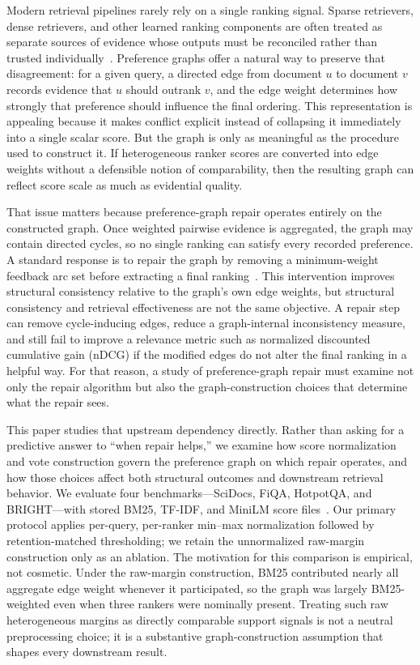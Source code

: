 \documentclass[manuscript,anonymous,review]{acmart}
\begin{document}
Modern retrieval pipelines rarely rely on a single ranking signal. Sparse
retrievers, dense retrievers, and other learned ranking components are often
treated as separate sources of evidence whose outputs must be reconciled
rather than trusted individually~\cite{liu2011learning,burges2005learning,dwork2001rank,ailon2008aggregating}.
Preference graphs offer a natural way to preserve that disagreement: for a
given query, a directed edge from document $u$ to document $v$ records
evidence that $u$ should outrank $v$, and the edge weight determines how
strongly that preference should influence the final ordering. This
representation is appealing because it makes conflict explicit instead of
collapsing it immediately into a single scalar score. But the graph is only
as meaningful as the procedure used to construct it. If heterogeneous ranker
scores are converted into edge weights without a defensible notion of
comparability, then the resulting graph can reflect score scale as much as
evidential quality.

That issue matters because preference-graph repair operates entirely on the
constructed graph. Once weighted pairwise evidence is aggregated, the graph
may contain directed cycles, so no single ranking can satisfy every recorded
preference. A standard response is to repair the graph by removing a
minimum-weight feedback arc set before extracting a final ranking~\cite{ailon2008aggregating,kenyon2007fewerrors}.
This intervention improves structural consistency relative to the graph's own
edge weights, but structural consistency and retrieval effectiveness are not
the same objective. A repair step can remove cycle-inducing edges, reduce a
graph-internal inconsistency measure, and still fail to improve a relevance
metric such as normalized discounted cumulative gain (nDCG) if the modified
edges do not alter the final ranking in a helpful way. For that reason, a
study of preference-graph repair must examine not only the repair algorithm
but also the graph-construction choices that determine what the repair sees.

This paper studies that upstream dependency directly. Rather than asking for
a predictive answer to ``when repair helps,'' we examine how score
normalization and vote construction govern the preference graph on which
repair operates, and how those choices affect both structural outcomes and
downstream retrieval behavior. We evaluate four benchmarks---SciDocs, FiQA,
HotpotQA, and BRIGHT---with stored BM25, TF-IDF, and MiniLM score
files~\cite{cohan2020scidocs,maia2018fiqa,yang2018hotpotqa,su2024bright}. Our
primary protocol applies per-query, per-ranker min--max normalization followed
by retention-matched thresholding; we retain the unnormalized raw-margin
construction only as an ablation. The motivation for this comparison is
empirical, not cosmetic. Under the raw-margin construction, BM25 contributed
nearly all aggregate edge weight whenever it participated, so the graph was
largely BM25-weighted even when three rankers were nominally present. Treating
such raw heterogeneous margins as directly comparable support signals is not a
neutral preprocessing choice; it is a substantive graph-construction
assumption that shapes every downstream result.
\end{document}
